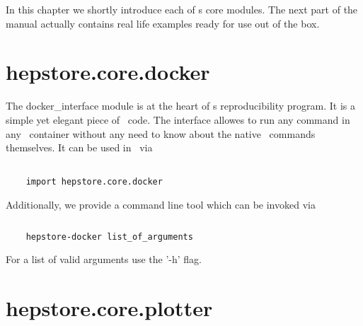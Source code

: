 
In this chapter we shortly introduce each of \hepstore s core
modules. The next part of the manual actually contains real life
examples ready for use out of the box. 

\section{hepstore.core.docker}

The docker\_interface module is at the heart of \hepstore s
reproducibility program. It is a simple yet elegant piece of
\python~code. The interface allowes to run any command in any
\docker~container without any need to know about the native
\docker~commands themselves. It can be used in \python~via
%
\begin{changemargin}{1.5cm}{1.5cm}
  \centering
  \begin{lstlisting}
    
    import hepstore.core.docker
  \end{lstlisting}
\end{changemargin}
%
Additionally, we provide a command line tool which can be invoked via
%
\begin{changemargin}{1.5cm}{1.5cm}
  \centering
  \begin{lstlisting}[language=Bash]
    
    hepstore-docker list_of_arguments
  \end{lstlisting}
\end{changemargin}
%
For a list of valid arguments use the '-h' flag.

\section{hepstore.core.plotter}

